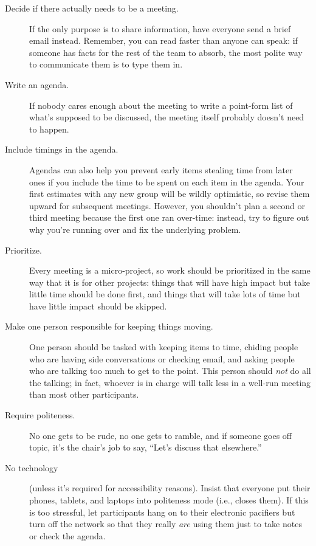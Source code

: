 \begin{description}

\item[Decide if there actually needs to be a meeting.] If the only
  purpose is to share information, have everyone send a brief email
  instead. Remember, you can read faster than anyone can speak: if
  someone has facts for the rest of the team to absorb, the most
  polite way to communicate them is to type them in.

\item[Write an agenda.]  If nobody cares enough about the meeting to
  write a point-form list of what's supposed to be discussed, the
  meeting itself probably doesn't need to happen.

\item[Include timings in the agenda.]  Agendas can also help you
  prevent early items stealing time from later ones if you include the
  time to be spent on each item in the agenda.  Your first estimates
  with any new group will be wildly optimistic, so revise them upward
  for subsequent meetings.  However, you shouldn't plan a second or
  third meeting because the first one ran over-time: instead, try to
  figure out why you're running over and fix the underlying problem.

\item[Prioritize.] Every meeting is a micro-project, so work should be
  prioritized in the same way that it is for other projects: things
  that will have high impact but take little time should be done
  first, and things that will take lots of time but have little impact
  should be skipped.

\item[Make one person responsible for keeping things moving.] One
  person should be tasked with keeping items to time, chiding people
  who are having side conversations or checking email, and asking
  people who are talking too much to get to the point.  This person
  should \emph{not} do all the talking; in fact, whoever is in charge
  will talk less in a well-run meeting than most other participants.

\item[Require politeness.] No one gets to be rude, no one gets to
  ramble, and if someone goes off topic, it's the chair's job to say,
  ``Let's discuss that elsewhere.''

\item[No technology] (unless it's required for accessibility reasons).
  Insist that everyone put their phones, tablets, and laptops into
  politeness mode (i.e., closes them).  If this is too stressful, let
  participants hang on to their electronic pacifiers but turn off the
  network so that they really \emph{are} using them just to take notes
  or check the agenda.


\end{description}
